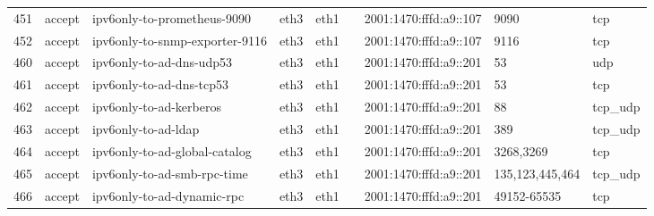 \begin{longtable}{|l|l|l|l|l|l|l|p{2.2cm}|l|}
451 & accept & ipv6only-to-prometheus-9090 & eth3 & eth1 &  & 2001:1470:fffd:a9::107 & 9090 & tcp \\
452 & accept & ipv6only-to-snmp-exporter-9116 & eth3 & eth1 &  & 2001:1470:fffd:a9::107 & 9116 & tcp \\
460 & accept & ipv6only-to-ad-dns-udp53 & eth3 & eth1 &  & 2001:1470:fffd:a9::201 & 53 & udp \\
461 & accept & ipv6only-to-ad-dns-tcp53 & eth3 & eth1 &  & 2001:1470:fffd:a9::201 & 53 & tcp \\
462 & accept & ipv6only-to-ad-kerberos & eth3 & eth1 &  & 2001:1470:fffd:a9::201 & 88 & tcp_udp \\
463 & accept & ipv6only-to-ad-ldap & eth3 & eth1 &  & 2001:1470:fffd:a9::201 & 389 & tcp_udp \\
464 & accept & ipv6only-to-ad-global-catalog & eth3 & eth1 &  & 2001:1470:fffd:a9::201 & 3268,3269 & tcp \\
465 & accept & ipv6only-to-ad-smb-rpc-time & eth3 & eth1 &  & 2001:1470:fffd:a9::201 & 135,123,445,464 & tcp_udp \\
466 & accept & ipv6only-to-ad-dynamic-rpc & eth3 & eth1 &  & 2001:1470:fffd:a9::201 & 49152-65535 & tcp \\
\hline
\end{longtable}


